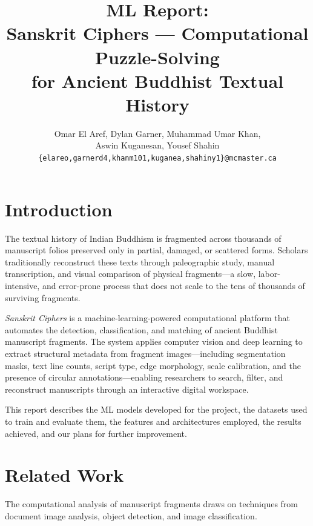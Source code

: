 \documentclass[11pt]{article}
\title{ML Report:\\Sanskrit Ciphers --- Computational Puzzle-Solving\\for Ancient Buddhist Textual History}
\author{Omar El Aref, Dylan Garner, Muhammad Umar Khan,\\Aswin Kuganesan, Yousef Shahin \\
  \texttt{\{elareo,garnerd4,khanm101,kuganea,shahiny1\}@mcmaster.ca} }
\begin{document}
\maketitle

\section{Introduction}

The textual history of Indian Buddhism is fragmented across thousands of manuscript folios preserved only in partial, damaged, or scattered forms.
Scholars traditionally reconstruct these texts through paleographic study, manual transcription, and visual comparison of physical fragments---a slow, labor-intensive, and error-prone process that does not scale to the tens of thousands of surviving fragments.

\textit{Sanskrit Ciphers} is a machine-learning-powered computational platform that automates the detection, classification, and matching of ancient Buddhist manuscript fragments.
The system applies computer vision and deep learning to extract structural metadata from fragment images---including segmentation masks, text line counts, script type, edge morphology, scale calibration, and the presence of circular annotations---enabling researchers to search, filter, and reconstruct manuscripts through an interactive digital workspace.

This report describes the ML models developed for the project, the datasets used to train and evaluate them, the features and architectures employed, the results achieved, and our plans for further improvement.

\section{Related Work}

The computational analysis of manuscript fragments draws on techniques from document image analysis, object detection, and image classification.
\end{document}
